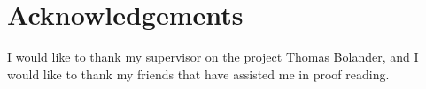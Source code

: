 \chapter{Acknowledgements}

I would like to thank my supervisor on the project Thomas Bolander,  and
I would like to thank my friends that have assisted me in proof reading.